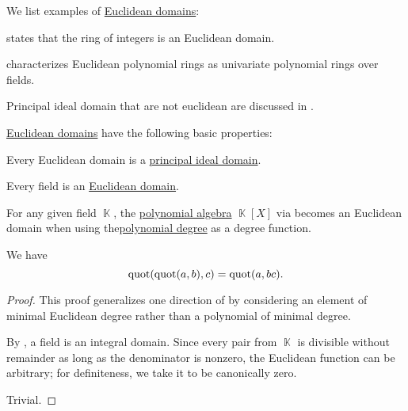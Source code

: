 \begin{example}\label{ex:def:euclidean_domain}
  We list examples of \hyperref[def:euclidean_domain]{Euclidean domains}:
  \begin{thmenum}
      states that the ring of integers is an Euclidean domain.

      characterizes Euclidean polynomial rings as univariate polynomial rings over fields.

     Principal ideal domain that are not euclidean are discussed in \cite{Anderson1988NonEuclideanPID}.
  \end{thmenum}
\end{example}

\begin{proposition}\label{thm:def:euclidean_domain}
  \hyperref[def:euclidean_domain]{Euclidean domains} have the following basic properties:
  \begin{thmenum}
     Every Euclidean domain is a \hyperref[def:principal_ideal_domain]{principal ideal domain}.

     Every field is an \hyperref[def:euclidean_domain]{Euclidean domain}.

     For any given field \( \BbbK \), the \hyperref[def:polynomial_algebra]{polynomial algebra} \( \BbbK[X] \) via  becomes an Euclidean domain when using the\hyperref[def:polynomial_degree]{polynomial degree} as a degree function.

     We have
    \begin{equation}\label{eq:thm:def:euclidean_domain/nested_quot}
      \operatorname{quot}(\operatorname{quot}(a, b), c) = \operatorname{quot}(a, bc).
    \end{equation}
  \end{thmenum}
\end{proposition}
\begin{proof}
   This proof generalizes one direction of  by considering an element of minimal Euclidean degree rather than a polynomial of minimal degree.

   By , a field is an integral domain. Since every pair from \( \BbbK \) is divisible without remainder as long as the denominator is nonzero, the Euclidean function can be arbitrary; for definiteness, we take it to be canonically zero.

   Trivial.
\end{proof}

